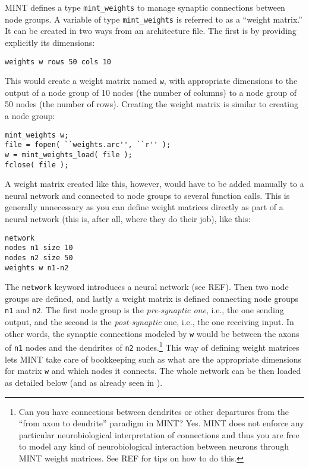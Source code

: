 \documentclass[12pt,letterpaper]{memoir}
\newcommand{\ls}[1]{\lstinline{#1}}
\let\fref\relax%
\newcommand{\mint}{MINT\xspace}
\begin{document}
\mint defines a type \lstinline{mint_weights} to manage synaptic
connections between node groups. A variable of type \ls{mint_weights}
is referred to as a ``weight matrix.'' It can be created in two ways
from an architecture file. The first is by providing explicitly its
dimensions:
\begin{lstlisting}
weights w rows 50 cols 10
\end{lstlisting}
This would create a weight matrix named \ls{w}, with appropriate
dimensions to the output of a node group of 10 nodes (the number of
columns) to a node group of 50 nodes (the number of rows). Creating
the weight matrix is similar to creating a node group:
\begin{lstlisting}
mint_weights w;
file = fopen( ``weights.arc'', ``r'' );
w = mint_weights_load( file );
fclose( file );
\end{lstlisting}
A weight matrix created like this, however, would have to be added
manually to a neural network and connected to node groups to several
function calls. This is generally unnecessary as you can define weight
matrices directly as part of a neural network (this is, after all,
where they do their job), like this:
\begin{lstlisting}
network
nodes n1 size 10
nodes n2 size 50
weights w n1-n2
\end{lstlisting}
The \ls{network} keyword introduces a neural network (see REF). Then
two node groups are defined, and lastly a weight matrix is defined
connecting node groups \ls{n1} and \ls{n2}. The first node group is
the \textit{pre-synaptic one}, i.e., the one sending output, and the
second is the \textit{post-synaptic} one, i.e., the one receiving
input. In other words, the synaptic connections modeled by \ls{w}
would be between the axons of \ls{n1} nodes and the dendrites of
\ls{n2} nodes.\footnote{Can you have connections between dendrites or
  other departures from the ``from axon to dendrite'' paradigm in
  \mint? Yes. \mint does not enforce any particular neurobiological
  interpretation of connections and thus you are free to model any
  kind of neurobiological interaction between neurons through \mint
  weight matrices. See REF for tips on how to do this.} This way of
defining weight matrices lets \mint take care of bookkeeping such as
what are the appropriate dimensions for matrix \ls{w} and which nodes
it connects. The whole network can be then loaded as detailed below
(and as already seen in \fref{sec:first-mint}).
\end{document}
